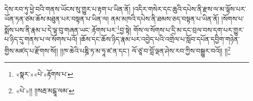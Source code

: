 དེས་རབ་ཏུ་ཕྱེ་བའི་གནས་ཡོངས་སུ་གྱུར་པ་རྟག་པ་ཡིན་ནོ། །འདིར་གསེར་དང་ཆུའི་དཔེས་ནི་རྫས་ལ་མ་ལྟོས་པར་ཡོན་ཏན་ཙམ་ཆོས་མཐུན་པར་བསྟན་པ་ཡིན་ལ། ནམ་མཁའི་དཔེས་ནི་ཐམས་ཅད་བསྟན་པ་ཡིན་ནོ། །སོགས་པ་སྨོས་པས་ནི་རྣམ་པ་དེ་ལྟ་བུ་གཞན་ཡང་:རྟོགས་པར་\footnote{«སྣར་»«པེ་»རྟོགས་པ་}བྱ་སྟེ། གོས་ལ་སོགས་པ་དྲི་མ་དང་བྲལ་བས་དག་པར་གྱུར་པ་ཉིད་དུ་གནས་པ་ལ་སོགས་པའོ། །ཆོས་དང་ཆོས་ཉིད་རྣམ་པར་འབྱེད་པའི་འགྲེལ་པ་སློབ་དཔོན་དབྱིག་གཉེན་གྱིས་མཛད་པ་རྫོགས་སོ།། །།ཁ་ཆེའི་པཎྜི་ཏ་མ་ཧཱ་ཛ་ན་དང་། ལོ་ཙཱ་བ་བློ་ལྡན་ཤེས་རབ་ཀྱིས་བསྒྱུར་བའོ།། །།\footnote{«པེ་»།། །།སརྦ་མངྒཱ་ལམ་}
